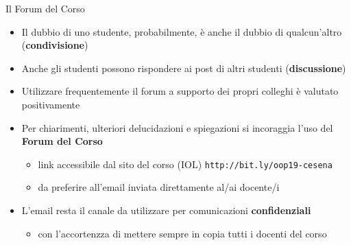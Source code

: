 \documentclass[presentation]{beamer}
\begin{document}
\begin{frame}{Il Forum del Corso}

\begin{block}{}
\begin{itemize}
\item Il dubbio di uno studente, probabilmente, è anche il dubbio di qualcun'altro (\textbf{condivisione}) 
\item Anche gli studenti possono rispondere ai post di altri studenti (\textbf{discussione})
\item Utilizzare frequentemente il forum a supporto dei propri colleghi è valutato positivamente
\end{itemize}
\end{block}
\vfill
\begin{itemize}
\item Per chiarimenti, ulteriori delucidazioni e spiegazioni si incoraggia l'uso del \textbf{Forum del Corso}
\begin{itemize}
\item link accessibile dal sito del corso (IOL) \texttt{http://bit.ly/oop19-cesena}
\item da preferire all'email inviata direttamente al/ai docente/i
\end{itemize}
\item L'email resta il canale da utilizzare per comunicazioni \textbf{confidenziali}
\begin{itemize}
\item con l'accortenzza di mettere sempre in copia tutti i docenti del corso
\end{itemize}
\end{itemize}



\end{frame}
\end{document}
